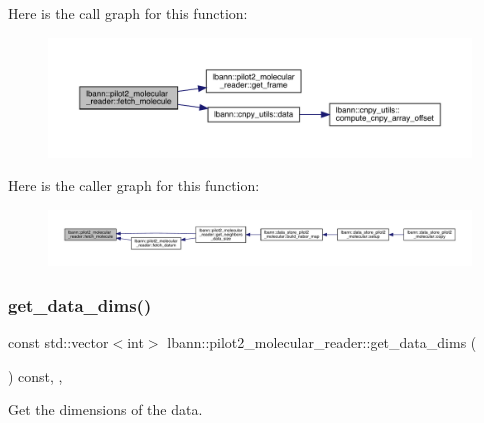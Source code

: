 Here is the call graph for this function\+:\nopagebreak
\begin{figure}[H]
\begin{center}
\leavevmode
\includegraphics[width=350pt]{classlbann_1_1pilot2__molecular__reader_ae45c583f72e11aeb5d955e2657a9a3e8_cgraph}
\end{center}
\end{figure}
Here is the caller graph for this function\+:\nopagebreak
\begin{figure}[H]
\begin{center}
\leavevmode
\includegraphics[width=350pt]{classlbann_1_1pilot2__molecular__reader_ae45c583f72e11aeb5d955e2657a9a3e8_icgraph}
\end{center}
\end{figure}
\mbox{\label{classlbann_1_1pilot2__molecular__reader_a0a59a7a38c01c4d8716fb24d36663c99}} 
\subsubsection{\texorpdfstring{get\+\_\+data\+\_\+dims()}{get\_data\_dims()}}
{\footnotesize\ttfamily const std\+::vector$<$int$>$ lbann\+::pilot2\+\_\+molecular\+\_\+reader\+::get\+\_\+data\+\_\+dims (\begin{DoxyParamCaption}{ }\end{DoxyParamCaption}) const\hspace{0.3cm}{\ttfamily [inline]}, {\ttfamily [override]}, {\ttfamily [virtual]}}



Get the dimensions of the data. 



